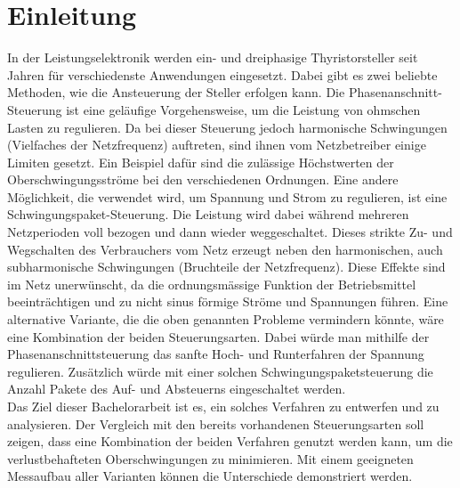 \section{Einleitung}











In der Leistungselektronik werden ein- und dreiphasige Thyristorsteller seit Jahren für verschiedenste Anwendungen eingesetzt. Dabei gibt es zwei beliebte Methoden, wie die Ansteuerung der Steller erfolgen kann. Die Phasenanschnitt-Steuerung ist eine geläufige Vorgehensweise, um die Leistung von ohmschen Lasten zu regulieren. Da bei dieser Steuerung jedoch harmonische Schwingungen (Vielfaches der Netzfrequenz) auftreten, sind ihnen vom Netzbetreiber einige Limiten gesetzt. Ein Beispiel dafür sind die zulässige Höchstwerten der Oberschwingungsströme bei den verschiedenen Ordnungen. Eine andere Möglichkeit, die verwendet wird, um Spannung und Strom zu regulieren, ist eine Schwingungspaket-Steuerung. Die Leistung wird dabei während mehreren Netzperioden voll bezogen und dann wieder weggeschaltet. Dieses strikte Zu- und Wegschalten des Verbrauchers vom Netz erzeugt neben den harmonischen, auch subharmonische Schwingungen (Bruchteile der Netzfrequenz). Diese Effekte sind im Netz unerwünscht, da die ordnungsmässige Funktion der Betriebsmittel beeinträchtigen und zu nicht sinus förmige Ströme und Spannungen führen.
Eine alternative Variante, die die oben genannten Probleme vermindern könnte, wäre eine Kombination der beiden Steuerungsarten. Dabei würde man mithilfe der Phasenanschnittsteuerung das sanfte Hoch- und Runterfahren der Spannung regulieren. Zusätzlich würde mit einer solchen Schwingungspaketsteuerung die Anzahl Pakete des Auf- und Absteuerns eingeschaltet werden.\\
Das Ziel dieser Bachelorarbeit ist es, ein solches Verfahren zu entwerfen und zu analysieren. Der Vergleich mit den bereits vorhandenen Steuerungsarten soll zeigen, dass eine Kombination der beiden Verfahren genutzt werden kann, um die verlustbehafteten Oberschwingungen zu minimieren. Mit einem geeigneten Messaufbau aller Varianten können die Unterschiede demonstriert werden.\\
